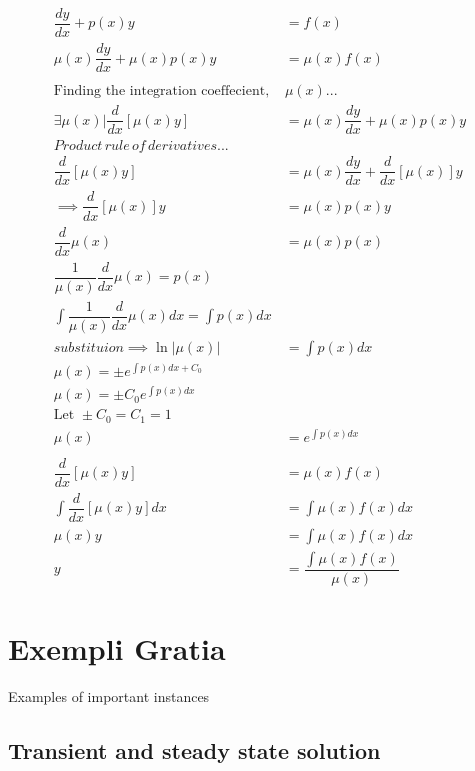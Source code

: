 \documentclass{article}
\begin{document}
\begin{align*}
\dfrac{dy}{dx}+p(x)y&=f(x)\\
\mu(x)\dfrac{dy}{dx}+\mu(x)p(x)y&=\mu(x)f(x)\\\\
\text{Finding the integration coeffecient, }&\mu(x)...\\
\exists\mu(x)|\dfrac{d}{dx}[\mu(x)y]&=\mu(x)\dfrac{dy}{dx}+\mu(x)p(x)y\\
Product\,rule\,of\,derivatives...\\
\dfrac{d}{dx}[\mu(x)y]&=\mu(x)\dfrac{dy}{dx}+\dfrac{d}{dx}[\mu(x)]y\\
\implies\dfrac{d}{dx}[\mu(x)]y&=\mu(x)p(x)y\\
\dfrac{d}{dx}\mu(x)&=\mu(x)p(x)\\
\dfrac{1}{\mu(x)}\dfrac{d}{dx}\mu(x)=p(x)\\
\int\dfrac{1}{\mu(x)}\dfrac{d}{dx}\mu(x)dx=\int p(x)dx\\
substituion\implies \ln|\mu(x)|&=\int p(x)dx\\
\mu(x)=\pm e^{\int p(x)dx+C_0}\\
\mu(x)=\pm C_0e^{\int p(x)dx}\\
\text{Let }\pm C_0=C_1=1\\
\mu(x)&=e^{\int p(x)dx}\\\\
\dfrac{d}{dx}[\mu(x)y]&=\mu(x)f(x)\\
\int\dfrac{d}{dx}[\mu(x)y]dx&=\int\mu(x)f(x)dx\\
\mu(x)y&=\int\mu(x)f(x)dx\\
y&=\dfrac{\int\mu(x)f(x)}{\mu(x)}
\end{align*}

\section{Exempli Gratia}

Examples of important instances

\subsection{Transient and steady state solution}
\end{document}
